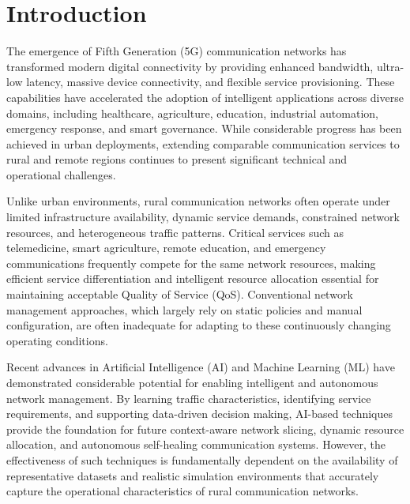 \documentclass[12pt,a4paper]{report}
\begin{document}
	
	
	
	\chapter{Introduction}
	\label{chap:introduction}
	
	The emergence of Fifth Generation (5G) communication networks has transformed modern digital connectivity by providing enhanced bandwidth, ultra-low latency, massive device connectivity, and flexible service provisioning. These capabilities have accelerated the adoption of intelligent applications across diverse domains, including healthcare, agriculture, education, industrial automation, emergency response, and smart governance. While considerable progress has been achieved in urban deployments, extending comparable communication services to rural and remote regions continues to present significant technical and operational challenges.
	
	Unlike urban environments, rural communication networks often operate under limited infrastructure availability, dynamic service demands, constrained network resources, and heterogeneous traffic patterns. Critical services such as telemedicine, smart agriculture, remote education, and emergency communications frequently compete for the same network resources, making efficient service differentiation and intelligent resource allocation essential for maintaining acceptable Quality of Service (QoS). Conventional network management approaches, which largely rely on static policies and manual configuration, are often inadequate for adapting to these continuously changing operating conditions.
	
	Recent advances in Artificial Intelligence (AI) and Machine Learning (ML) have demonstrated considerable potential for enabling intelligent and autonomous network management. By learning traffic characteristics, identifying service requirements, and supporting data-driven decision making, AI-based techniques provide the foundation for future context-aware network slicing, dynamic resource allocation, and autonomous self-healing communication systems. However, the effectiveness of such techniques is fundamentally dependent on the availability of representative datasets and realistic simulation environments that accurately capture the operational characteristics of rural communication networks.
	
\end{document}
